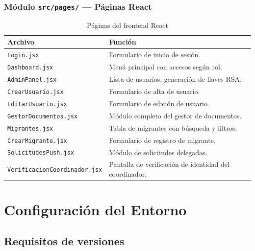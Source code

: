 \documentclass[10pt,letterpaper]{report}
\begin{document}
\subsection{Módulo \texttt{src/pages/} — Páginas React}

\begin{table}[H]
\centering
\caption{Páginas del frontend React}
\label{tab:paginas}
\begin{tabular}{p{} p{}}
\toprule
\textbf{Archivo} & \textbf{Función} \\
\midrule
\texttt{Login.jsx} & Formulario de inicio de sesión. \\
\texttt{Dashboard.jsx} & Menú principal con accesos según rol. \\
\texttt{AdminPanel.jsx} & Lista de usuarios, generación de llaves RSA. \\
\texttt{CrearUsuario.jsx} & Formulario de alta de usuario. \\
\texttt{EditarUsuario.jsx} & Formulario de edición de usuario. \\
\texttt{GestorDocumentos.jsx} & Módulo completo del gestor de documentos. \\
\texttt{Migrantes.jsx} & Tabla de migrantes con búsqueda y filtros. \\
\texttt{CrearMigrante.jsx} & Formulario de registro de migrante. \\
\texttt{SolicitudesPush.jsx} & Módulo de solicitudes delegadas. \\
\texttt{VerificacionCoordinador.jsx} & Pantalla de verificación de identidad del coordinador. \\
\bottomrule
\end{tabular}
\end{table}

\chapter{Configuración del Entorno}

\section{Requisitos de versiones}
\end{document}
